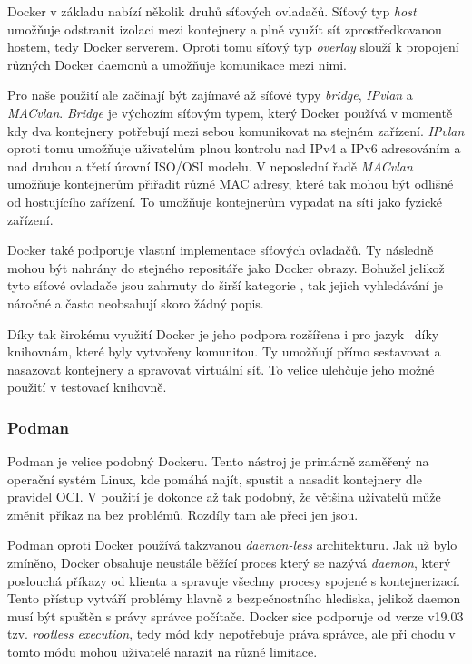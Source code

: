 Docker v základu nabízí několik druhů síťových ovladačů. Síťový typ \textit{host} umožňuje odstranit izolaci mezi kontejnery a plně využít síť zprostředkovanou hostem, tedy Docker serverem. Oproti tomu síťový typ \textit{overlay} slouží k propojení různých Docker daemonů a umožňuje komunikace mezi nimi. 

Pro naše použití ale začínají být zajímavé až síťové typy \textit{bridge}, \textit{IPvlan} a \textit{MACvlan}. \textit{Bridge} je výchozím síťovým typem, který Docker používá v momentě kdy dva kontejnery potřebují mezi sebou komunikovat na stejném zařízení. \textit{IPvlan} oproti tomu umožňuje uživatelům plnou kontrolu nad IPv4 a IPv6 adresováním a nad druhou a třetí úrovní ISO/OSI modelu. V neposlední řadě \textit{MACvlan} umožňuje kontejnerům přiřadit různé MAC adresy, které tak mohou být odlišné od hostujícího zařízení. To umožňuje kontejnerům vypadat na síti jako fyzické zařízení.

Docker také podporuje vlastní implementace síťových ovladačů. Ty následně mohou být nahrány do stejného repositáře jako Docker obrazy. Bohužel jelikož tyto síťové ovladače jsou zahrnuty do širší kategorie , tak jejich vyhledávání je náročné a často neobsahují skoro žádný popis. \cite{docker_networking_overview}\cite{docker_brige_overview}

Díky tak širokému využití Docker je jeho podpora rozšířena i pro jazyk \csharp~díky knihovnám, které byly vytvořeny komunitou. Ty umožňují přímo sestavovat a nasazovat kontejnery a spravovat virtuální síť. To velice ulehčuje jeho možné použití v testovací knihovně. 

\subsubsection{Podman}
Podman je velice podobný Dockeru. Tento nástroj je primárně zaměřený na operační systém Linux, kde pomáhá najít, spustit a nasadit kontejnery dle pravidel OCI. V použití je dokonce až tak podobný, že většina uživatelů může změnit příkaz  na  bez problémů. Rozdíly tam ale přeci jen jsou. 

Podman oproti Docker používá takzvanou \textit{daemon-less} architekturu. Jak už bylo zmíněno, Docker obsahuje neustále běžící proces který se nazývá \textit{daemon}, který poslouchá příkazy od klienta a spravuje všechny procesy spojené s kontejnerizací. Tento přístup vytváří problémy hlavně z bezpečnostního hlediska, jelikož daemon musí být spuštěn s právy správce počítače. Docker sice podporuje od verze v19.03 tzv. \textit{rootless execution}, tedy mód kdy nepotřebuje práva správce, ale při chodu v tomto módu mohou uživatelé narazit na různé limitace.

